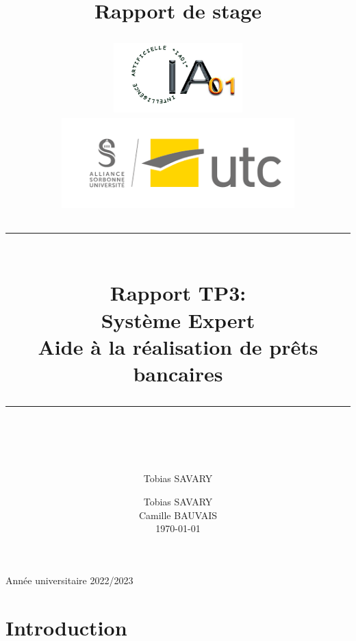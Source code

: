 \documentclass[
]{article}
\newcommand{\HRule}[1]{\rule{\linewidth}{#1}}
\begin{document}
\title{Rapport de stage}
\author{Tobias SAVARY}
\date{}

\title{ \begin{center}
          \includegraphics[width=5cm]{img/logo_IA01.png} \hspace*{1cm}
          \includegraphics[width=9cm]{img/logo_UTC.png} \\ [2cm]
  \end{center}
		\HRule{2pt} \\
		\LARGE \textbf{Rapport TP3:\\Système Expert \\ Aide à la réalisation de prêts bancaires} 
		\HRule{2pt} \\ [5.5cm]
		\normalsize  
        \author{
            Tobias SAVARY \\[0.5cm]
            Camille BAUVAIS \\[1cm]
      \today
        }
		}
        
		\maketitle
        \begin{center}
            Année universitaire 2022/2023
        \end{center}
\pagebreak

\tableofcontents
\pagebreak

\hypertarget{introduction}{%
\section{Introduction}\label{introduction}}
\end{document}
